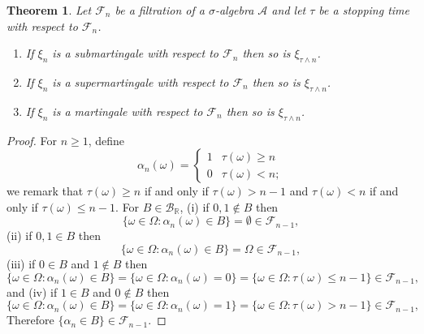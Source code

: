 \documentclass{article}
\newtheorem{theorem}{Theorem}
\theoremstyle{definition}
\begin{document}
\begin{theorem}
Let $\mathscr{F}_n$ be a filtration of a $\sigma$-algebra $\mathscr{A}$ and let $\tau$ be a stopping time with respect to $\mathscr{F}_n$. 
\begin{enumerate}
\item If $\xi_n$ is a submartingale with respect to $\mathscr{F}_n$ then so is $\xi_{\tau \wedge n}$.
\item If $\xi_n$ is a supermartingale with respect to $\mathscr{F}_n$ then so is $\xi_{\tau \wedge n}$.
\item If $\xi_n$ is a martingale with respect to $\mathscr{F}_n$ then so is $\xi_{\tau \wedge n}$.
\end{enumerate}
\label{stopped}
\end{theorem}
\begin{proof}
For $n \geq 1$, define
\[
\alpha_n(\omega) = \begin{cases}
1&\tau(\omega) \geq n\\
0&\tau(\omega) < n;
\end{cases}
\]
we remark that
$\tau(\omega) \geq n$ if and only if $\tau(\omega)>n-1$ and
$\tau(\omega)<n$ if and only if $\tau(\omega) \leq n-1$.
For $B \in \mathscr{B}_{\mathbb{R}}$,
(i) if $0,1 \not \in B$ then
\[
\{\omega \in \Omega: \alpha_n(\omega) \in B\} = \emptyset \in \mathscr{F}_{n-1},
\]
(ii) if $0,1 \in B$ then
\[
\{\omega \in \Omega: \alpha_n(\omega) \in B\} = \Omega \in \mathscr{F}_{n-1},
\]
(iii) if $0 \in B$ and $1 \not \in B$ then
\[
\{\omega \in \Omega: \alpha_n(\omega) \in B\}  = \{\omega \in \Omega: \alpha_n(\omega)=0\}
=\{\omega \in \Omega: \tau(\omega)\leq n-1\} \in \mathscr{F}_{n-1},
\]
and (iv) if $1 \in B$ and $0 \not \in B$ then
\[
\{\omega \in \Omega: \alpha_n(\omega) \in B\}  = \{\omega \in \Omega: \alpha_n(\omega)=1\}
=\{\omega \in \Omega: \tau(\omega) >  n-1\} \in \mathscr{F}_{n-1},
\]
Therefore $\{ \alpha_n \in B\} \in \mathscr{F}_{n-1}$. 


\end{proof}
\end{document}
